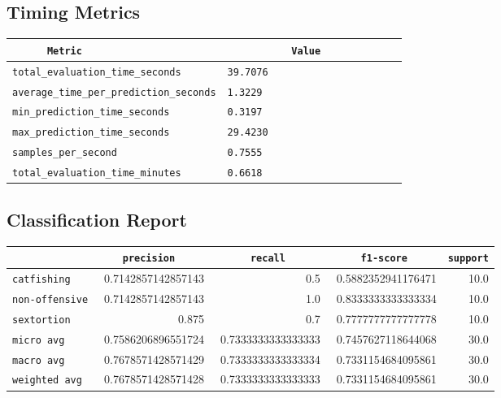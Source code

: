\documentclass{article}
\begin{document}
\subsection{Timing Metrics}

\begin{center}
\begin{tabular}{l | l} \hline
    \verb|      Metric     | & \verb|           Value           | \\ \hline
    \hline
    \verb|total_evaluation_time_seconds| & \verb|39.7076                      | \\ \hline
    \verb|average_time_per_prediction_seconds| & \verb|1.3229                       | \\ \hline
    \verb|min_prediction_time_seconds| & \verb|0.3197                       | \\ \hline
    \verb|max_prediction_time_seconds| & \verb|29.4230                      | \\ \hline
    \verb|samples_per_second| & \verb|0.7555                       | \\ \hline
    \verb|total_evaluation_time_minutes| & \verb|0.6618                       | \\ \hline
\end{tabular}
\end{center}

\subsection{Classification Report}

\begin{center}
\begin{tabular}{l | r | r | r | r} \hline
    \verb|            | & \verb|    precision     | & \verb|      recall      | & \verb|     f1-score     | & \verb|support| \\ \hline
    \hline
    \verb|catfishing | & 0.7142857142857143 & 0.5 & 0.5882352941176471 &    10.0 \\ \hline
    \verb|non-offensive| & 0.7142857142857143 & 1.0 & 0.8333333333333334 &    10.0 \\ \hline
    \verb|sextortion | & 0.875 & 0.7 & 0.7777777777777778 &    10.0 \\ \hline
    \verb|micro avg  | & 0.7586206896551724 & 0.7333333333333333 & 0.7457627118644068 &    30.0 \\ \hline
    \verb|macro avg  | & 0.7678571428571429 & 0.7333333333333334 & 0.7331154684095861 &    30.0 \\ \hline
    \verb|weighted avg| & 0.7678571428571428 & 0.7333333333333333 & 0.7331154684095861 &    30.0 \\ \hline
\end{tabular}
\end{center}
\end{document}
